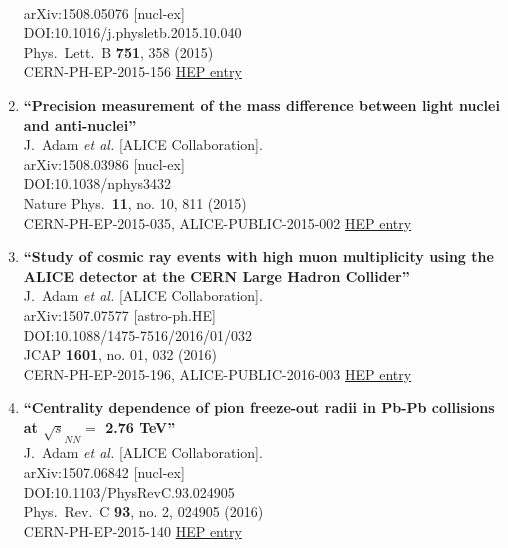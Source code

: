 \begin{enumerate}
  \\{}arXiv:1508.05076 [nucl-ex]
  \\{}DOI:10.1016/j.physletb.2015.10.040
  \\{}Phys.\ Lett.\ B {\bf 751}, 358 (2015)
  \\{}CERN-PH-EP-2015-156
\href{http://inspirehep.net/record/1388730}{HEP entry}
\item%
{\bf ``Precision measurement of the mass difference between light nuclei and anti-nuclei''}
  \\{}J.~Adam {\it et al.} [ALICE Collaboration].
  \\{}arXiv:1508.03986 [nucl-ex]
  \\{}DOI:10.1038/nphys3432
  \\{}Nature Phys.\  {\bf 11}, no. 10, 811 (2015)
  \\{}CERN-PH-EP-2015-035, ALICE-PUBLIC-2015-002
\href{http://inspirehep.net/record/1388181}{HEP entry}
\item%
{\bf ``Study of cosmic ray events with high muon multiplicity using the ALICE detector at the CERN Large Hadron Collider''}
  \\{}J.~Adam {\it et al.} [ALICE Collaboration].
  \\{}arXiv:1507.07577 [astro-ph.HE]
  \\{}DOI:10.1088/1475-7516/2016/01/032
  \\{}JCAP {\bf 1601}, no. 01, 032 (2016)
  \\{}CERN-PH-EP-2015-196, ALICE-PUBLIC-2016-003
\href{http://inspirehep.net/record/1385276}{HEP entry}
\item%
{\bf ``Centrality dependence of pion freeze-out radii in Pb-Pb collisions at $\sqrt{s}_{NN}=$ 2.76 TeV''}
  \\{}J.~Adam {\it et al.} [ALICE Collaboration].
  \\{}arXiv:1507.06842 [nucl-ex]
  \\{}DOI:10.1103/PhysRevC.93.024905
  \\{}Phys.\ Rev.\ C {\bf 93}, no. 2, 024905 (2016)
  \\{}CERN-PH-EP-2015-140
\href{http://inspirehep.net/record/1384807}{HEP entry}

\end{enumerate}

